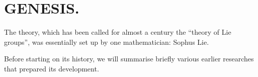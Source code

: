 \section{GENESIS.}

The theory, which has been called for almost a century the ``theory of Lie groups'', was essentially set up by one mathematician: Sophus Lie.

Before starting on its history, we will summarise briefly various earlier researches that prepared its development.

